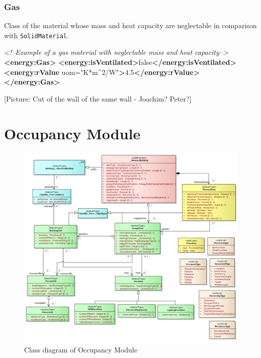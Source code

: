 \documentclass[a4paper,12pt]{article}
\newenvironment{Shaded}{}{}
\newcommand{\KeywordTok}[1]{\textcolor[rgb]{0.00,0.44,0.13}{\textbf{{#1}}}}
\newcommand{\StringTok}[1]{\textcolor[rgb]{0.25,0.44,0.63}{{#1}}}
\newcommand{\CommentTok}[1]{\textcolor[rgb]{0.38,0.63,0.69}{\textit{{#1}}}}
\newcommand{\OtherTok}[1]{\textcolor[rgb]{0.00,0.44,0.13}{{#1}}}
\newcommand{\NormalTok}[1]{{#1}}
\let\stdsection\section%
\renewcommand\section{\newpage\stdsection}
\begin{document}
\subsubsection{Gas}\label{gas}

Class of the material whose mass and heat capacity are neglectable in
comparison with \texttt{SolidMaterial}.

\begin{Shaded}
\begin{Highlighting}[]
\CommentTok{<!--Example of a gas material with neglectable mass and heat capacity-->}
\KeywordTok{<energy:Gas>}
    \KeywordTok{<energy:isVentilated>}\NormalTok{false}\KeywordTok{</energy:isVentilated>}
    \KeywordTok{<energy:rValue}\OtherTok{ uom=}\StringTok{"K*m^2/W"}\KeywordTok{>}\NormalTok{4.5}\KeywordTok{</energy:rValue>}
\KeywordTok{</energy:Gas>}
\end{Highlighting}
\end{Shaded}

{[}Picture: Cut of the wall of the same wall - Joachim? Peter?{]}

\section{Occupancy Module}\label{occupancy-module}

\begin{figure}[htbp]
\centering
\includegraphics{fig/class_occupancy.png}
\caption{Class diagram of Occupancy Module}
\end{figure}
\end{document}
